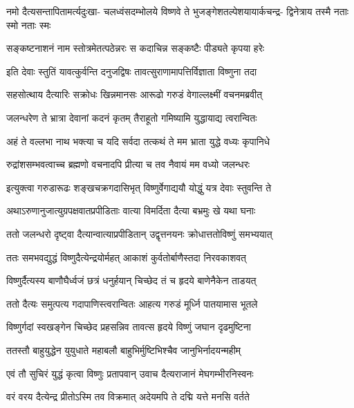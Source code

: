 \fourlineindentedshloka
{नमो दैत्यसन्तापितामर्त्यदुःखा-}
{चलध्वंसदम्भोलये विष्णवे ते}
{भुजङ्गेशतल्पेशयायार्कचन्द्र-}
{द्विनेत्राय तस्मै नताः स्मो नताः स्मः} %


\twolineshloka
{सङ्कष्टनाशनं नाम स्तोत्रमेतत्पठेन्नरः}
{स कदाचिन्न सङ्कष्टैः पीड्यते कृपया हरेः} %

\twolineshloka
{इति देवाः स्तुतिं यावत्कुर्वन्ति दनुजद्विषः}
{तावत्सुराणामापत्तिर्विज्ञाता विष्णुना तदा} %

\twolineshloka
{सहसोत्थाय दैत्यारिः सक्रोधः खिन्नमानसः}
{आरूढो गरुडं वेगाल्लक्ष्मीं वचनमब्रवीत्} %


\twolineshloka
{जलन्धरेण ते भ्रात्रा देवानां कदनं कृतम्}
{तैराहूतो गमिष्यामि युद्धायाद्य त्वरान्वितः} %


\twolineshloka
{अहं ते वल्लभा नाथ भक्त्या च यदि सर्वदा}
{तत्कथं ते मम भ्राता युद्धे वध्यः कृपानिधे} %


\twolineshloka
{रुद्रांशसम्भवत्वाच्च ब्रह्मणो वचनादपि}
{प्रीत्या च तव नैवायं मम वध्यो जलन्धरः} %


\twolineshloka
{इत्युक्त्वा गरुडारूढः शङ्खचक्रगदासिभृत्}
{विष्णुर्वेगाद्ययौ योद्धुं यत्र देवाः स्तुवन्ति ते} %

\twolineshloka
{अथाऽरुणानुजात्युग्रपक्षवातप्रपीडिताः}
{वात्या विमर्दिता दैत्या बभ्रमुः खे यथा घनाः} %

\twolineshloka
{ततो जलन्धरो दृष्ट्वा दैत्यान्वात्याप्रपीडितान्}
{उद्वृत्तनयनः क्रोधात्ततोविष्णुं समभ्ययात्} %

\twolineshloka
{ततः समभवद्युद्धं विष्णुदैत्येन्द्रयोर्महत्}
{आकाशं कुर्वतोर्बाणैस्तदा निरवकाशवत्} %

\twolineshloka
{विष्णुर्दैत्यस्य बाणौघैर्ध्वजं छत्रं धनुर्हयान्}
{चिच्छेद तं च हृदये बाणेनैकेन ताडयत्} %

\twolineshloka
{ततो दैत्यः समुत्पत्य गदापाणिस्त्वरान्वितः}
{आहत्य गरुडं मूर्ध्नि पातयामास भूतले} %

\twolineshloka
{विष्णुर्गदां स्वखङ्गेन चिच्छेद प्रहसन्निव}
{तावत्स हृदये विष्णुं जघान दृढमुष्टिना} %

\twolineshloka
{ततस्तौ बाहुयुद्धेन युयुधाते महाबलौ}
{बाहुभिर्मुष्टिभिश्चैव जानुभिर्नादयन्महीम्} %

\twolineshloka
{एवं तौ सुचिरं युद्धं कृत्वा विष्णुः प्रतापवान्}
{उवाच दैत्यराजानं मेघगम्भीरनिस्वनः} %


\twolineshloka
{वरं वरय दैत्येन्द्र प्रीतोऽस्मि तव विक्रमात्}
{अदेयमपि ते दद्मि यत्ते मनसि वर्तते} %

